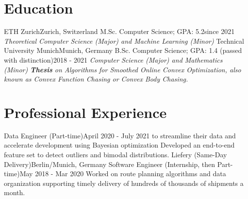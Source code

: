 \documentclass[a4paper,20pt]{article}
\begin{document}


\vspace{-5pt}
\section{Education}
  \resumeSubHeadingListStart
    \resumeSubheading
      {ETH Zurich}{Zurich, Switzerland}
      {M.Sc. Computer Science; GPA: 5.2}{since 2021}
      {\scriptsize \textit{ \footnotesize{\newline{}Theoretical Computer Science (Major) and Machine Learning (Minor)}}}
    \resumeSubHeadingListEnd
\vspace{-5pt}
  \resumeSubHeadingListStart
    \resumeSubheading
      {Technical University Munich}{Munich, Germany}
      {B.Sc. Computer Science; GPA: 1.4 (passed with distinction)}{2018 - 2021}
      {\scriptsize \textit{ \footnotesize{\newline{}Computer Science (Major) and Mathematics (Minor)}
      \footnotesize{\newline{}\textbf{Thesis} on Algorithms for Smoothed Online Convex Optimization, also known as Convex Function Chasing or Convex Body Chasing.}}}
    \resumeSubHeadingListEnd

\vspace{-5pt}
\section{Professional Experience}
  \resumeSubHeadingListStart
    {Data Engineer (Part-time)}{April 2020 - July 2021}
    \resumeItemListStart
          {to streamline their data and accelerate development using Bayesian optimization}
          {Developed an end-to-end feature set to detect outliers and bimodal distributions.}
      \resumeItemListEnd
    \resumeSubheading
		{Liefery (Same-Day Delivery)}{Berlin/Munich, Germany}
		{Software Engineer (Internship, then Part-time)}{May 2018 - Mar 2020}
		\resumeItemListStart
          {Worked on route planning algorithms and data organization supporting timely delivery of hundreds of thousands of shipments a month.}
		\resumeItemListEnd
\resumeSubHeadingListEnd
\end{document}
